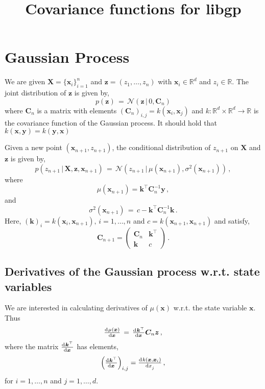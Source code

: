 \documentclass{article}
\title{Covariance functions for libgp}
\newcommand{\bx}{\bm{x}}
\newcommand{\bX}{\bm{X}}
\newcommand{\by}{\bm{y}}
\newcommand{\bz}{\bm{z}}
\newcommand{\bk}{\bm{k}}
\newcommand{\bC}{\bm{C}}
\newcommand{\R}{\mathbb{R}}
\newcommand{\NORMAL}{\mathcal{N}}
\begin{document}


\maketitle

\section{Gaussian Process}

We are given $\bX=\{\bx_i\}_{i=1}^n$ and $\bz=(z_1,\ldots,z_n)$ with $\bx_i \in \R^d$ and $z_i \in \R$. 
The joint distribution of $\bz$ is given by,
%
\begin{equation}
p(\bz) \,=\, \NORMAL \left( \bz \,|\,  0, \bC_n  \right)
\end{equation}
%
where $\bC_n$ is a matrix with elements $(\bC_n)_{i,j} = k(\bx_i,\bx_j)$ and $k: \R^d \times \R^d \rightarrow \R$ is the covariance function of the Gaussian process. It should hold that $k(\bx,\by) = k(\by,\bx)$
%


Given a new point $(\bx_{n+1},z_{n+1})$, the conditional distribution of $z_{n+1}$ on $\bX$ and $\bz$ is given by,
%
\begin{equation}
p(z_{n+1} \,|\, \bX,\bz,\bx_{n+1}) \,=\, \NORMAL \left( z_{n+1} \,|\,  \mu(\bx_{n+1}), \sigma^2(\bx_{n+1})  \right) \, ,
\end{equation}
%
where
%
\begin{equation}
 \mu(\bx_{n+1}) = \bk^\top \bC_n^{-1} \by \, ,
\end{equation}
%
and
%
\begin{equation}
\sigma^2(\bx_{n+1}) \, = \,  c - \bk^\top \bC_n^{-1} \bk	\, .
\end{equation}
%
Here, $(\bk)_i = k(\bx_{i},\bx_{n+1}), \, i=1,\ldots,n$ and $c = k(\bx_{n+1},\bx_{n+1})$ and satisfy,
%
\begin{equation}
\bC_{n+1} = 
 \begin{pmatrix}
  \bC_{n} & \bk ^\top  \\
  \bk & c
 \end{pmatrix} \, .
\end{equation}



\subsection{Derivatives of the Gaussian process w.r.t. state variables}

We are interested in calculating derivatives of $\mu(\bx)$ w.r.t. the state variable $\bx$. Thus
%
\begin{equation}
\od{\mu(\bx)}{\bx} \, = \, \od{\bk^\top}{\bx} \bC_n \bz \, ,
\end{equation}
%
where the matrix $ \od{\bk^\top}{\bx}$ has elements,
%
\begin{equation}
\left ( \od{\bk^\top}{\bx} \right )_{i,j} = \od{k(\bx, \bx_i)}{x_j} \, ,
\end{equation}
%
for $i=1,\ldots,n$ and $j=1,\ldots,d$.
\end{document}
